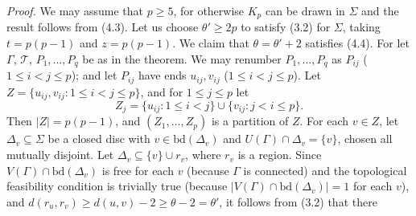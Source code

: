 \textit{Proof.} We may assume that $p \ge 5$, for otherwise $K_p$ can be drawn in $\Sigma$ and the result follows from (4.3). Let us choose $\theta' \ge 2p$ to satisfy (3.2) for $\Sigma$, taking $t = p(p - 1)$ and $z = p(p - 1)$. We claim that $\theta = \theta' + 2$ satisfies (4.4). For let $\Gamma$, $\mathscr{T}$, $P_1, \dots, P_q$ be as in the theorem. We may renumber $P_1, \dots, P_q$ as $P_{ij}$ ($1 \le i < j \le p$); and let $P_{ij}$ have ends $u_{ij}, v_{ij}$ ($1 \le i < j \le p$). Let $Z = \{u_{ij}, v_{ij} \colon 1 \le i < j \le p\}$, and for $1 \le j \le p$ let
\begin{equation*}
Z_j = \{u_{ij} \colon 1 \le i < j\} \cup \{v_{ij} \colon j < i \le p\}.
\end{equation*}
Then $|Z| = p(p - 1)$, and $(Z_1, \dots, Z_p)$ is a partition of $Z$. For each $v \in Z$, let $\Delta_v \subseteq \Sigma$ be a closed disc with $v \in \text{bd}(\Delta_v)$ and $U(\Gamma) \cap \Delta_v = \{v\}$, chosen all mutually disjoint. Let $\Delta_v \subseteq \{v\} \cup r_v$, where $r_v$ is a region. Since $V(\Gamma) \cap \text{bd}(\Delta_v)$ is free for each $v$ (because $\Gamma$ is connected) and the topological feasibility condition is trivially true (because $|V(\Gamma) \cap \text{bd}(\Delta_v)| = 1$ for each $v$), and $d(r_u, r_v) \ge d(u, v) - 2 \ge \theta - 2 = \theta'$, it follows from (3.2) that there
